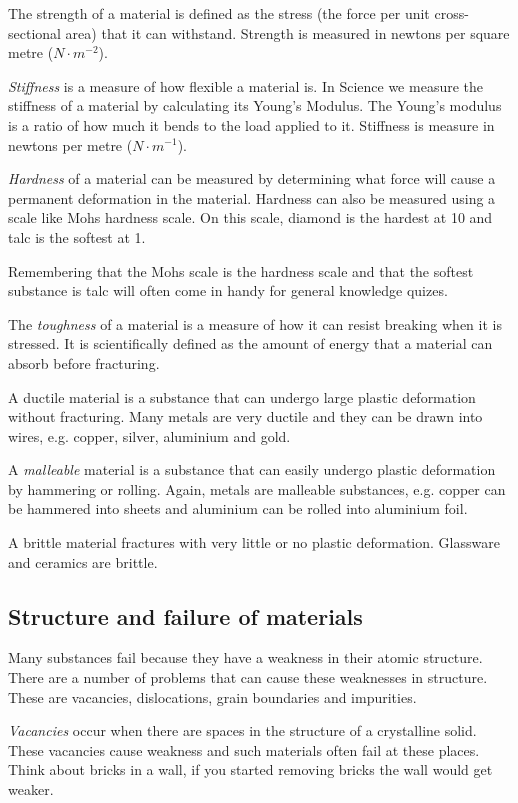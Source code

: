 The strength of a material is defined as the stress (the force per unit cross-sectional area) that it can withstand. Strength is measured in newtons per square metre ($N \cdot m^{-2}$).

\emph{Stiffness} is a measure of how flexible a material is. In Science we measure the stiffness of a material by calculating its Young's Modulus. The Young's modulus is a ratio of how much it bends to the load applied to it. Stiffness is measure in newtons per metre ($N \cdot m^{-1}$).
 
\emph{Hardness} of a material can be measured by determining what force will cause a permanent deformation in the material. Hardness can also be measured using a scale like Mohs hardness scale. On this scale, diamond is the hardest at 10 and talc is the softest at 1.

\begin{IFact}{Remembering that the Mohs scale is the hardness scale and that the softest substance is talc will often come in handy for general knowledge quizes.}\end{IFact}

The \emph{toughness} of a material is a measure of how it can resist breaking when it is stressed. It is scientifically defined as the amount of energy that a material can absorb before fracturing.

A ductile material is a substance that can undergo large plastic deformation without fracturing. Many metals are very ductile and they can be drawn into wires, e.g. copper, silver, aluminium and gold.

A \emph{malleable} material is a substance that can easily undergo plastic deformation by hammering or rolling. Again, metals are malleable substances, e.g. copper can be hammered into sheets and aluminium can be rolled into aluminium foil.
 
A brittle material fractures with very little or no plastic deformation. Glassware and ceramics are brittle.

\subsection{Structure and failure of materials}

Many substances fail because they have a weakness in their atomic structure. There are a number of problems that can cause these weaknesses in structure. These are vacancies, dislocations, grain boundaries and impurities.

\emph{Vacancies} occur when there are spaces in the structure of a crystalline solid. These vacancies cause weakness and such materials often fail at these places. Think about bricks in a wall, if you started removing bricks the wall would get weaker.

